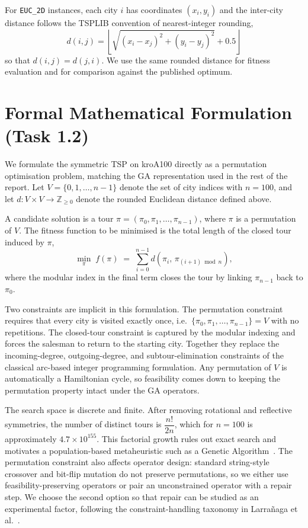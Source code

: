 For \texttt{EUC\_2D} instances, each city $i$ has coordinates $(x_i, y_i)$ and
the inter-city distance follows the TSPLIB convention of nearest-integer
rounding,
\[
d(i,j) = \left\lfloor \sqrt{(x_i - x_j)^2 + (y_i - y_j)^2} + 0.5 \right\rfloor
\]
so that $d(i,j) = d(j,i)$. We use the same rounded distance for fitness
evaluation and for comparison against the published optimum.

\section{Formal Mathematical Formulation (Task 1.2)}
\label{T1:Formulation}

We formulate the symmetric TSP on kroA100 directly as a permutation
optimisation problem, matching the GA representation used in the rest of the
report. Let $V = \{0, 1, \ldots, n-1\}$ denote the set of city indices with
$n=100$, and let $d : V \times V \to \mathbb{Z}_{\geq 0}$ denote the rounded
Euclidean distance defined above.

A candidate solution is a tour $\pi = (\pi_0, \pi_1, \ldots, \pi_{n-1})$,
where $\pi$ is a permutation of $V$. The fitness function to be minimised is
the total length of the closed tour induced by $\pi$,
\[
\min_{\pi} \; f(\pi)
\;=\;
\sum_{i=0}^{n-1} d\!\left(\pi_i,\, \pi_{(i+1) \bmod n}\right),
\]
where the modular index in the final term closes the tour by linking
$\pi_{n-1}$ back to $\pi_0$.

Two constraints are implicit in this formulation. The permutation constraint
requires that every city is visited exactly once, i.e.\
$\{\pi_0, \pi_1, \ldots, \pi_{n-1}\} = V$ with no repetitions. The
closed-tour constraint is captured by the modular indexing and forces the
salesman to return to the starting city. Together they replace the
incoming-degree, outgoing-degree, and subtour-elimination constraints of the
classical arc-based integer programming formulation. Any permutation of $V$
is automatically a Hamiltonian cycle, so feasibility comes down to keeping
the permutation property intact under the GA operators.

The search space is discrete and finite. After removing rotational and
reflective symmetries, the number of distinct tours is $\dfrac{n!}{2n}$, which
for $n=100$ is approximately $4.7 \times 10^{155}$. This factorial growth
rules out exact search and motivates a population-based metaheuristic such as
a Genetic Algorithm~\cite{holland1975adaptation,goldberg1989genetic}.
The permutation constraint also affects operator design: standard
string-style crossover and bit-flip mutation do not preserve permutations,
so we either use feasibility-preserving operators or pair an unconstrained
operator with a repair step. We choose the second option so that repair can
be studied as an experimental factor, following the constraint-handling
taxonomy in Larra{\~n}aga et al.~\cite{larranaga1999genetic}.

